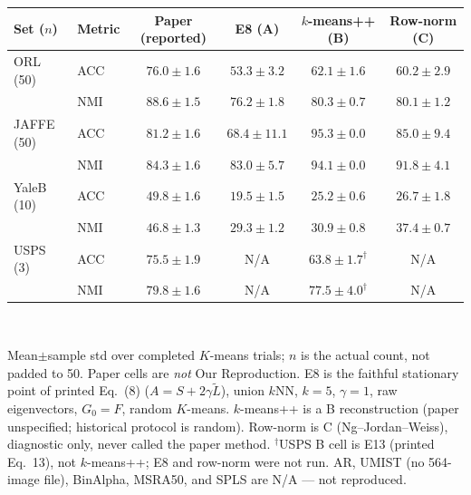 \setlength{\tabcolsep}{2.4pt}
\begin{tabular}{llcccc}
\toprule
Set ($n$) & Metric & Paper (reported) & E8 (A) & $k$-means++ (B) & Row-norm (C) \\
\midrule
ORL (50) & ACC & $76.0{\pm}1.6$ & $53.3{\pm}3.2$ & $62.1{\pm}1.6$ & $60.2{\pm}2.9$ \\
         & NMI & $88.6{\pm}1.5$ & $76.2{\pm}1.8$ & $80.3{\pm}0.7$ & $80.1{\pm}1.2$ \\
JAFFE (50) & ACC & $81.2{\pm}1.6$ & $68.4{\pm}11.1$ & $95.3{\pm}0.0$ & $85.0{\pm}9.4$ \\
           & NMI & $84.3{\pm}1.6$ & $83.0{\pm}5.7$ & $94.1{\pm}0.0$ & $91.8{\pm}4.1$ \\
YaleB (10) & ACC & $49.8{\pm}1.6$ & $19.5{\pm}1.5$ & $25.2{\pm}0.6$ & $26.7{\pm}1.8$ \\
           & NMI & $46.8{\pm}1.3$ & $29.3{\pm}1.2$ & $30.9{\pm}0.8$ & $37.4{\pm}0.7$ \\
USPS (3) & ACC & $75.5{\pm}1.9$ & N/A & $63.8{\pm}1.7^{\dagger}$ & N/A \\
         & NMI & $79.8{\pm}1.6$ & N/A & $77.5{\pm}4.0^{\dagger}$ & N/A \\
\bottomrule
\end{tabular}\\[2pt]
{\raggedright\scriptsize
Mean$\pm$sample std over completed $K$-means trials; $n$ is the actual count, not padded to 50.
Paper cells are \emph{not} Our Reproduction.
E8 is the faithful stationary point of printed Eq.~(8) ($A=S+2\gamma\widetilde L$), union $k$NN, $k{=}5$, $\gamma{=}1$, raw eigenvectors, $G_0{=}F$, random $K$-means.
$k$-means++ is a B reconstruction (paper unspecified; historical protocol is random).
Row-norm is C (Ng--Jordan--Weiss), diagnostic only, never called the paper method.
$^{\dagger}$USPS B cell is E13 (printed Eq.~13), not $k$-means++; E8 and row-norm were not run.
AR, UMIST (no 564-image file), BinAlpha, MSRA50, and SPLS are N/A --- not reproduced.
\par}
